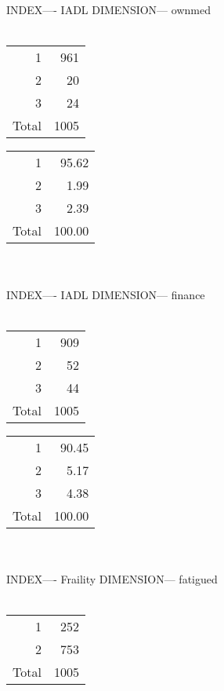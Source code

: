 \documentclass[11pt]{article}
\begin{document}
\\\\ 
INDEX---- IADL DIMENSION--- ownmed 
 \\\\ 
% 
\begin{tabular}{rr}
   \hline
1 & 961 \\ 
  2 &  20 \\ 
  3 &  24 \\ 
  Total & 1005 \\ 
   \hline
\end{tabular}
% 
\begin{tabular}{rr}
   \hline
1 & 95.62 \\ 
  2 & 1.99 \\ 
  3 & 2.39 \\ 
  Total & 100.00 \\ 
   \hline
\end{tabular}
\\\\ 
INDEX---- IADL DIMENSION--- finance 
 \\\\ 
% 
\begin{tabular}{rr}
   \hline
1 & 909 \\ 
  2 &  52 \\ 
  3 &  44 \\ 
  Total & 1005 \\ 
   \hline
\end{tabular}
% 
\begin{tabular}{rr}
   \hline
1 & 90.45 \\ 
  2 & 5.17 \\ 
  3 & 4.38 \\ 
  Total & 100.00 \\ 
   \hline
\end{tabular}
\\\\ 
INDEX---- Fraility DIMENSION--- fatigued 
 \\\\ 
% 
\begin{tabular}{rr}
   \hline
1 & 252 \\ 
  2 & 753 \\ 
  Total & 1005 \\ 
   \hline
\end{tabular}
\end{document}
